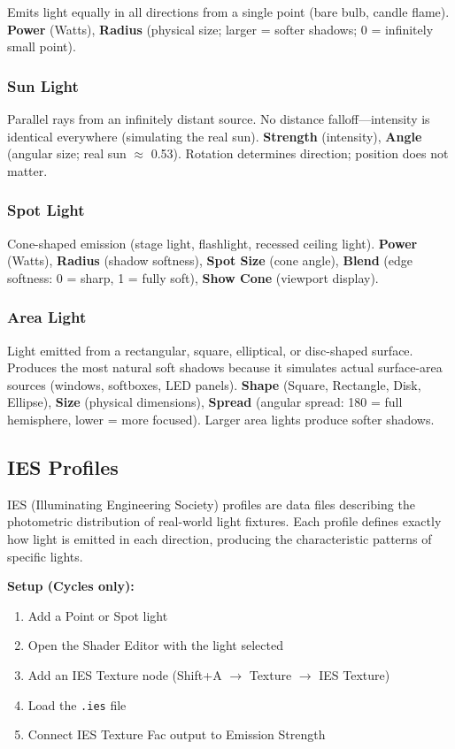 Emits light equally in all directions from a single point (bare
bulb, candle flame). \textbf{Power} (Watts), \textbf{Radius}
(physical size; larger = softer shadows; 0 = infinitely small
point).

\subsubsection{Sun Light}

Parallel rays from an infinitely distant source. No distance
falloff---intensity is identical everywhere (simulating the real
sun). \textbf{Strength} (intensity), \textbf{Angle} (angular size;
real sun $\approx$ 0.53\textdegree). Rotation determines direction;
position does not matter.

\subsubsection{Spot Light}

Cone-shaped emission (stage light, flashlight, recessed ceiling
light). \textbf{Power} (Watts), \textbf{Radius} (shadow softness),
\textbf{Spot Size} (cone angle), \textbf{Blend} (edge softness:
0 = sharp, 1 = fully soft), \textbf{Show Cone} (viewport display).

\subsubsection{Area Light}

Light emitted from a rectangular, square, elliptical, or disc-shaped
surface. Produces the most natural soft shadows because it simulates
actual surface-area sources (windows, softboxes, LED panels).
\textbf{Shape} (Square, Rectangle, Disk, Ellipse), \textbf{Size}
(physical dimensions), \textbf{Spread} (angular spread: 180\textdegree{}
= full hemisphere, lower = more focused). Larger area lights produce
softer shadows.

\subsection{IES Profiles}

IES (Illuminating Engineering Society) profiles are data files
describing the photometric distribution of real-world light
fixtures. Each profile defines exactly how light is emitted in each
direction, producing the characteristic patterns of specific lights.

\textbf{Setup (Cycles only):}
\begin{enumerate}[leftmargin=2em]
  \item Add a Point or Spot light
  \item Open the Shader Editor with the light selected
  \item Add an IES Texture node (Shift+A $\rightarrow$ Texture
        $\rightarrow$ IES Texture)
  \item Load the \texttt{.ies} file
  \item Connect IES Texture Fac output to Emission Strength
\end{enumerate}

